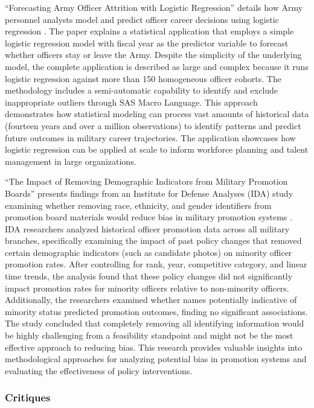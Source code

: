 \documentclass[../main.tex]{subfiles}
\begin{document}
``Forecasting Army Officer Attrition with Logistic Regression'' details how Army personnel analysts model and predict officer career decisions using logistic regression \citep{mcallaster1999}. The paper explains a statistical application that employs a simple logistic regression model with fiscal year as the predictor variable to forecast whether officers stay or leave the Army. Despite the simplicity of the underlying model, the complete application is described as large and complex because it runs logistic regression against more than 150 homogeneous officer cohorts. The methodology includes a semi-automatic capability to identify and exclude inappropriate outliers through SAS Macro Language. This approach demonstrates how statistical modeling can process vast amounts of historical data (fourteen years and over a million observations) to identify patterns and predict future outcomes in military career trajectories. The application showcases how logistic regression can be applied at scale to inform workforce planning and talent management in large organizations.

``The Impact of Removing Demographic Indicators from Military Promotion Boards'' presents findings from an Institute for Defense Analyses (IDA) study examining whether removing race, ethnicity, and gender identifiers from promotion board materials would reduce bias in military promotion systems \citep{ida2024}. IDA researchers analyzed historical officer promotion data across all military branches, specifically examining the impact of past policy changes that removed certain demographic indicators (such as candidate photos) on minority officer promotion rates. After controlling for rank, year, competitive category, and linear time trends, the analysis found that these policy changes did not significantly impact promotion rates for minority officers relative to non-minority officers. Additionally, the researchers examined whether names potentially indicative of minority status predicted promotion outcomes, finding no significant associations. The study concluded that completely removing all identifying information would be highly challenging from a feasibility standpoint and might not be the most effective approach to reducing bias. This research provides valuable insights into methodological approaches for analyzing potential bias in promotion systems and evaluating the effectiveness of policy interventions.

\subsubsection{Critiques}
\end{document}
